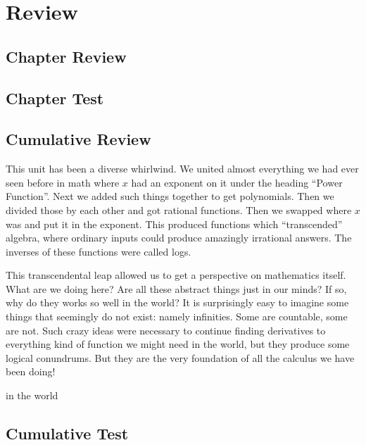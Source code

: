 \newpage
\section{Review}
\subsection{Chapter Review}
\subsection{Chapter Test}
\subsection{Cumulative Review}
This unit has been a diverse whirlwind.  We united almost everything we had ever seen
before in math where $x$ had an exponent on it under the heading ``Power Function''.
Next we added such things together to get polynomials.  Then we divided those by each
other and got rational functions.  Then we swapped where $x$ was and put it in the
exponent.  This produced functions which ``transcended'' algebra, where ordinary inputs
could produce amazingly irrational answers.  The inverses of these functions were called
logs.

This transcendental leap allowed us to get a perspective on mathematics itself.  What 
are we doing here?  Are all these abstract things just in our minds?  If so, why do they 
works so well in the world?  It is surprisingly easy to imagine some things that 
seemingly do not exist: namely infinities.  Some are countable, some are not.  Such
crazy ideas were necessary to continue finding derivatives to everything kind of function
we might need in the world, but they produce some logical conundrums.   But they
are the very foundation of all the calculus we have been doing!

in the world
\subsection{Cumulative Test}